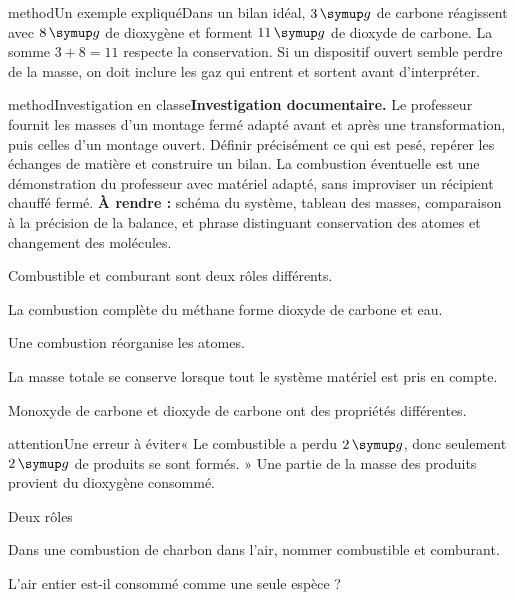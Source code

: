 \begin{pcEncadre}{method}{Un exemple expliqué}Dans un bilan idéal, $3\unite g$ de carbone réagissent avec $8\unite g$ de dioxygène et forment $11\unite g$ de dioxyde de carbone. La somme $3+8=11$ respecte la conservation. Si un dispositif ouvert semble perdre de la masse, on doit inclure les gaz qui entrent et sortent avant d’interpréter.\end{pcEncadre}
\label{activite-6}
\begin{pcEncadre}{method}{Investigation en classe}\textbf{Investigation documentaire.} Le professeur fournit les masses d’un montage fermé adapté avant et après une transformation, puis celles d’un montage ouvert. Définir précisément ce qui est pesé, repérer les échanges de matière et construire un bilan. La combustion éventuelle est une démonstration du professeur avec matériel adapté, sans improviser un récipient chauffé fermé. \textbf{À rendre :} schéma du système, tableau des masses, comparaison à la précision de la balance, et phrase distinguant conservation des atomes et changement des molécules.\end{pcEncadre}
\begin{questions}
\item Combustible et comburant sont deux rôles différents.
\item La combustion complète du méthane forme dioxyde de carbone et eau.
\item Une combustion réorganise les atomes.
\item La masse totale se conserve lorsque tout le système matériel est pris en compte.
\item Monoxyde de carbone et dioxyde de carbone ont des propriétés différentes.
\end{questions}
\begin{pcEncadre}{attention}{Une erreur à éviter}« Le combustible a perdu $2\unite g$, donc seulement $2\unite g$ de produits se sont formés. » Une partie de la masse des produits provient du dioxygène consommé.\end{pcEncadre}
\pcGrille
\clearpage{}
\par\noindent\begin{minipage}{\linewidth}
\begin{exercice}[1]{Deux rôles}
\begin{questions}
\item Dans une combustion de charbon dans l’air, nommer combustible et comburant.
\item L’air entier est-il consommé comme une seule espèce ?
\end{questions}
\end{exercice}
\end{minipage}
